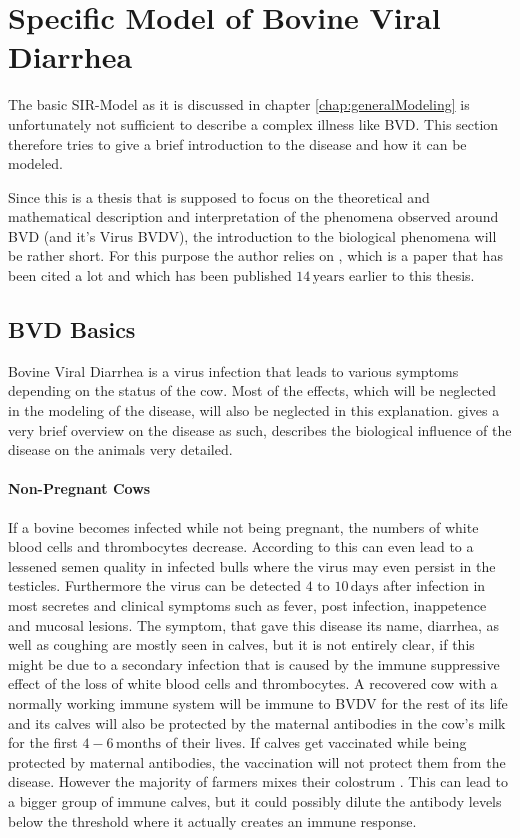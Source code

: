 \section{Specific Model of Bovine Viral Diarrhea}
\label{chap:bvdModel}
The basic SIR-Model as it is discussed in chapter \ref{chap:generalModeling} is unfortunately not sufficient to describe a complex illness like BVD. This section therefore tries to give a brief introduction to the disease and how it can be modeled.

Since this is a thesis that is supposed to focus on the theoretical and mathematical description and interpretation of the phenomena observed around BVD (and it's Virus BVDV), the introduction to the biological phenomena will be rather short. For this purpose the author relies on \citep{LIN03}, which is a paper that has been cited a lot and which has been published $14\,\text{years}$ earlier to this thesis.

\subsection{BVD Basics}\label{chap:bvdBasics}
Bovine Viral Diarrhea is a virus infection that leads to various symptoms depending on the status of the cow. Most of the effects, which will be neglected in the modeling of the disease, will also be neglected in this explanation. \citep{openagrar_mods_00019481} gives a very brief overview on the disease as such, \citep{LIN03} describes the biological influence of the disease on the animals very detailed.

\paragraph{Non-Pregnant Cows} If a bovine becomes infected while not being pregnant, the numbers of white blood cells and thrombocytes decrease. According to \citep{LIN03} this can even lead to a lessened semen quality in infected bulls where the virus may even persist in the testicles. Furthermore the virus can be detected $4 \text{ to } 10\,\text{days}$ after infection in most secretes and \glqq clinical symptoms such as fever, post infection, inappetence and mucosal lesions\grqq. The symptom, that gave this disease its name, diarrhea, as well as coughing are mostly seen in calves, but it is not entirely clear, if this might be due to a secondary infection that is caused by the immune suppressive effect of the loss of white blood cells and thrombocytes.
A recovered cow with a normally working immune system will be immune to BVDV for the rest of its life and its calves will also be protected by the maternal antibodies in the cow's milk for the first $4-6\, \text{months}$ of their lives. If calves get vaccinated while being protected by maternal antibodies, the vaccination will not protect them from the disease. However the majority of farmers mixes their colostrum \citep{personalCom}. This can lead to a bigger group of immune calves, but it could possibly dilute the antibody levels below the threshold where it actually creates an immune response.

